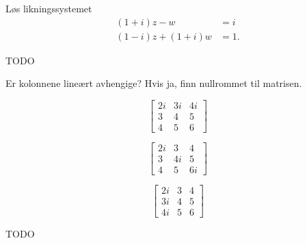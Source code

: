 
\begin{oppgave}
Løs likningssystemet
\begin{align*}
(1+i) z - w   &= i \\
(1-i) z + (1+i) w &= 1.
\end{align*}
\end{oppgave}

\begin{losning}
TODO
\end{losning}


\begin{oppgave}
Er kolonnene lineært avhengige? Hvis ja, finn nullrommet til matrisen.
\begin{punkt}
\[
\begin{bmatrix}
2i & 3i & 4i \\ 3 & 4 & 5 \\ 4 & 5 & 6 
\end{bmatrix}
\]
\end{punkt}

\begin{punkt}
\[
\begin{bmatrix}
2i & 3 & 4 \\ 3 & 4i & 5 \\ 4 & 5 & 6i 
\end{bmatrix}
\]
\end{punkt}

\begin{punkt}
\[
\begin{bmatrix}
2i & 3 & 4 \\ 3i & 4 & 5 \\ 4i & 5 & 6 
\end{bmatrix}
\]
\end{punkt}
\end{oppgave}

\begin{losning}
TODO
\end{losning}



